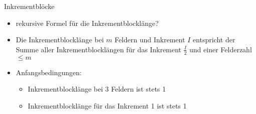 \begin{frame}{Inkrementblöcke}
    \begin{itemize}
        \item<1-> rekursive Formel für die Inkrementblocklänge?
        \item<2-> Die Inkrementblocklänge bei $m$ Feldern und Inkrement $I$ entspricht der Summe aller Inkrementblocklängen für das Inkrement $\frac{I}{2}$ und einer Felderzahl $\leq m$
        \item<3-> Anfangsbedingungen:
        \begin{itemize}
            \item<4-> Inkrementblocklänge bei 3 Feldern ist stets 1
            \item<5-> Inkrementblocklänge für das Inkrement 1 ist stets 1
        \end{itemize}
    \end{itemize}
\end{frame}